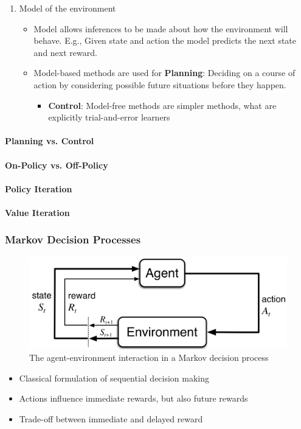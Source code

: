 \documentclass[a4paper, twoside, 12pt]{article}
\let\cite\shortcite
\begin{document}
\begin{enumerate}
\begin{itemize}
\end{itemize}
\item Model of the environment
\label{sec:orgb58d5b8}
\begin{itemize}
\item Model allows inferences to be made about how the environment will behave.
E.g., Given state and action the model predicts the next state and next reward.
\item Model-based methods are used for \textbf{\textbf{Planning}}: Deciding on a course of action by
considering possible future situations before they happen.
\begin{itemize}
\item \textbf{\textbf{Control}}: Model-free methods are simpler methods, what are explicitly trial-and-error learners
\end{itemize}
\end{itemize}
\end{enumerate}
\paragraph{Planning vs. Control}
\label{sec:org8224dab}
\paragraph{On-Policy vs. Off-Policy}
\label{sec:org17ad62a}
\paragraph{Policy Iteration}
\label{sec:org3377a46}
\paragraph{Value Iteration}
\label{sec:org3f23347}
\subsubsection{Markov Decision Processes}
\label{sec:org437caa3}

\begin{figure}[htbp]
\centering
\includegraphics[width=.9\linewidth]{./fig/mdp_interaction.png}
\caption[Markov Decision Process]{The agent-environment interaction in a Markov decision process \cite{sutton18_reinf}}
\end{figure}
\begin{itemize}
\item Classical formulation of sequential decision making
\item Actions influence immediate rewards, but also future rewards
\item Trade-off between immediate and delayed reward
\end{itemize}
\end{document}
